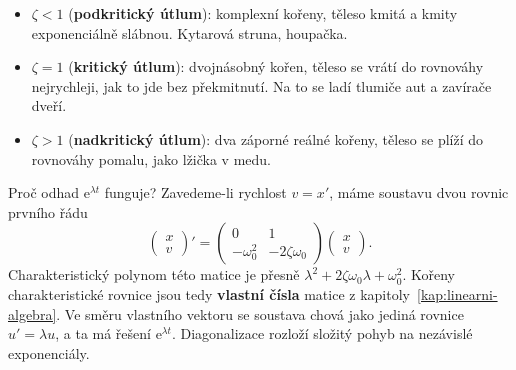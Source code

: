 \begin{center}
\end{center}

\begin{itemize}
  \item $\zeta < 1$ (\textbf{podkritický útlum}): komplexní kořeny, těleso kmitá a kmity exponenciálně slábnou. Kytarová struna, houpačka.
  \item $\zeta = 1$ (\textbf{kritický útlum}): dvojnásobný kořen, těleso se vrátí do rovnováhy nejrychleji, jak to jde bez překmitnutí. Na to se ladí tlumiče aut a zavírače dveří.
  \item $\zeta > 1$ (\textbf{nadkritický útlum}): dva záporné reálné kořeny, těleso se plíží do rovnováhy pomalu, jako lžička v medu.
\end{itemize}

Proč odhad $\mathrm{e}^{\lambda t}$ funguje? Zavedeme-li rychlost $v = x'$, máme soustavu dvou rovnic prvního řádu
\begin{equation*}
  \begin{pmatrix} x\\ v\end{pmatrix}' = \begin{pmatrix} 0 & 1\\ -\omega_0^2 & -2\zeta\omega_0\end{pmatrix}\begin{pmatrix} x\\ v\end{pmatrix}.
\end{equation*}
Charakteristický polynom této matice je přesně $\lambda^2 + 2\zeta\omega_0\lambda + \omega_0^2$. Kořeny charakteristické rovnice jsou tedy \textbf{vlastní čísla} matice z kapitoly~\ref{kap:linearni-algebra}. Ve směru vlastního vektoru se soustava chová jako jediná rovnice $u' = \lambda u$, a ta má řešení $\mathrm{e}^{\lambda t}$. Diagonalizace rozloží složitý pohyb na nezávislé exponenciály.

